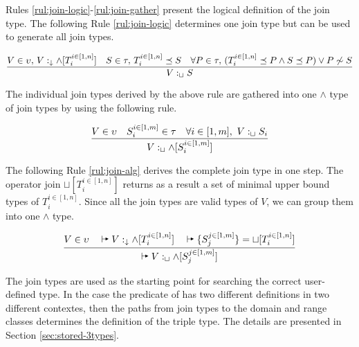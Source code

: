 \documentclass[runningheads]{llncs}
\newcommand{\darr}{\downarrow}
\newcommand{\llb}{\llbracket}
\newcommand{\rrb}{\rrbracket}
\newcommand{\vdasharr}{%
    \mathrel{%
        \vdash\hspace*{-5pt}%
        \raisebox{2.3pt}{\scalebox{.5}{\(\blacktriangleright\)}}%
    }%
}\newcommand{\D}{{\Delta}}
\newcommand{\notes}[1]{\noindent\begin{small}-- \emph{#1}\hfill\break\end{small}}
\newcommand{\nnotes}[1]{\indent\begin{small}-- \emph{#1}\hfill\break\end{small}}
\newcommand{\ennotes}[1]{\indent\begin{small}-- \emph{#1}\hfill\end{small}}
\begin{document}

Rules \ref{rul:join-logic}-\ref{rul:join-gather} present the logical
definition of the join type. The following Rule \ref{rul:join-logic}
determines one join type but can be used to generate all join types.


\begin{equation}
\label{rul:join-logic}
\dfrac{V\in\upsilon,\, \/V:_\darr\land[T_i^{i\in[1,n]}]\quad\/S\in\tau,\, T_i^{i\in[1,n]}\preceq\/S\quad\forall\/P\in\tau,\, (T_i^{i\in[1,n]}\preceq\/P\land\/S\preceq\/P)\lor\/P\not\sim\/S}
      {V:_\sqcup\/S}
\end{equation}

The individual join types derived by the above rule are gathered
into one $\land$ type of join types by using the following rule.

\begin{equation}
\label{rul:join-gather}
\dfrac{V\in\upsilon\quad\/S_i^{i\in[1,m]}\in\tau\quad\forall\/i\in[1,m],\ V:_\sqcup\/S_i}
{V:_{\sqcup}\land[S_i^{i\in[1,m]}]}
\end{equation}

The following Rule \ref{rul:join-alg} derives the complete join type
in one step. The operator join $\sqcup[T_i^{i\in[1,n]}]$ returns as a
result a set of minimal upper bound types of $T_i^{i\in[1,n]}$. Since
all the join types are valid types of $V$, we can group them into one
$\land$ type.

\begin{equation}
\label{rul:join-alg} 
\dfrac{V\in\upsilon\quad\vdasharr\/V:_\darr\land[T_i^{i\in[1,n]}]\quad\/\vdasharr\{S_j^{j\in[1,m]}\}=\sqcup[T_i^{i\in[1,n]}]}
      {\vdasharr\/V:_\sqcup\land[S_j^{j\in[1,m]}]}
\end{equation}

The join types are used as the starting point for searching the
correct user-defined type. In the case the predicate of has two
different definitions in two different contextes, then the paths from
join types to the domain and range classes determines the definition
of the triple type. The details are presented in Section
\ref{sec:stored-3types}.

\end{document}
